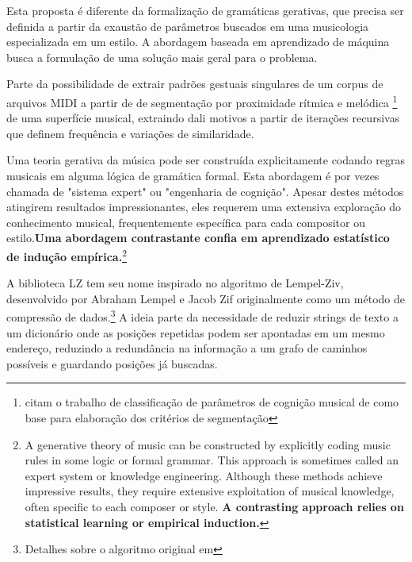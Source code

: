 \documentclass[
	12pt,				%
	openright,			%
	twoside,			%
	a4paper,			%
	english,			%
	french,				%
	spanish,			%
	brazil				%
	]{abntex2}
\begin{document}
Esta proposta é diferente da formalização de gramáticas gerativas, que precisa ser definida a partir da exaustão de parâmetros buscados em uma musicologia especializada em um estilo. A abordagem baseada em aprendizado de máquina busca a formulação de uma solução mais geral para o problema.

Parte da possibilidade de extrair padrões gestuais singulares de um corpus de arquivos MIDI a partir de de segmentação por proximidade rítmica e melódica \footnote{  citam o trabalho de classificação de parâmetros de cognição musical de  como base para elaboração dos critérios de segmentação } de uma superfície musical, extraindo dali motivos a partir de iterações recursivas que definem frequência e variações de similaridade.

\begin{citacao}
Uma teoria gerativa da música pode ser construída explicitamente codando regras musicais em alguma lógica de gramática formal. Esta abordagem é por vezes chamada de "sistema expert" ou "engenharia de cognição". Apesar destes métodos atingirem resultados impressionantes, eles requerem uma extensiva exploração do conhecimento musical, frequentemente específica para cada compositor ou estilo.\textbf{Uma abordagem contrastante confia em aprendizado estatístico de indução empírica.}\cite[p. 74, grifos nossos]{dubnov2003using}\footnote{A generative theory of music can be constructed by explicitly coding music rules in some logic or formal grammar. This approach is sometimes called an expert system or knowledge engineering. Although these methods achieve impressive results, they require extensive exploitation of musical knowledge, often specific to each composer or style.
\textbf{A contrasting approach relies on statistical learning or empirical induction.}\cite[p. 74, grifos nossos]{dubnov2003using}}
\end{citacao}

A biblioteca LZ tem seu nome inspirado no algoritmo de Lempel-Ziv, desenvolvido por Abraham Lempel e Jacob Zif originalmente como um método de compressão de dados.\footnote{Detalhes sobre o algoritmo original em } A ideia parte da necessidade de reduzir strings de texto a um dicionário onde as posições repetidas podem ser apontadas em um mesmo endereço, reduzindo a redundância na informação a um grafo de caminhos possíveis e guardando posições já buscadas.
\end{document}
